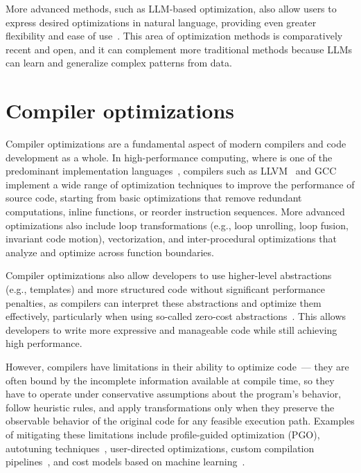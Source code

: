 More advanced methods, such as LLM-based optimization, also allow users to express desired optimizations in natural language, providing even greater flexibility and ease of use~\cite{mahmud2023autoparllm,merouani2025agentic}. This area of optimization methods is comparatively recent and open, and it can complement more traditional methods because LLMs can learn and generalize complex patterns from data.


\section{Compiler optimizations}

Compiler optimizations are a fundamental aspect of modern compilers and code development as a whole. In high-performance computing, where \cpp is one of the predominant implementation languages~\cite{laguna2019large}, compilers such as LLVM~\cite{lattner2004llvm} and GCC~\cite{gcc} implement a wide range of optimization techniques to improve the performance of source code, starting from basic optimizations that remove redundant computations, inline functions, or reorder instruction sequences. More advanced optimizations also include loop transformations (e.g., loop unrolling, loop fusion, invariant code motion), vectorization, and inter-procedural optimizations that analyze and optimize across function boundaries.

Compiler optimizations also allow developers to use higher-level abstractions (e.g., \cpp templates) and more structured code without significant performance penalties, as compilers can interpret these abstractions and optimize them effectively, particularly when using so-called zero-cost abstractions~\cite{stroustrup2012foundations}. This allows developers to write more expressive and manageable code while still achieving high performance.

However, compilers have limitations in their ability to optimize code~--- they are often bound by the incomplete information available at compile time, so they have to operate under conservative assumptions about the program's behavior, follow heuristic rules, and apply transformations only when they preserve the observable behavior of the original code for any feasible execution path.
Examples of mitigating these limitations include profile-guided optimization (PGO), autotuning techniques~\cite{ansel2014opentuner}, user-directed optimizations, custom compilation pipelines~\cite{kruse2018user}, and cost models based on machine learning~\cite{baghdadi2021deep}.


